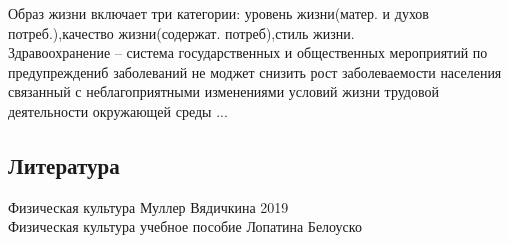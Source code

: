 \documentclass[a4paper, 12pt]{article}
\begin{document}
Образ жизни включает три категории: уровень жизни(матер. и духов потреб.),качество жизни(содержат. потреб),стиль жизни.\\

Здравоохранение -- система государственных и общественных мероприятий по предупреждениб заболеваний не моджет снизить рост заболеваемости населения связанный с неблагоприятными изменениями условий жизни трудовой деятельности окружающей среды ...\\












\newpage
\subsection*{Литература} 
Физическая культура Муллер Вядичкина 2019\\
Физическая культура учебное пособие Лопатина Белоуско \\ 
\end{document}
